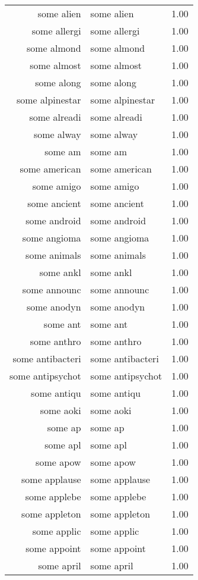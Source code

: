 \begin{table}[ht]
\begin{tabular}{rlr}
  some alien & some alien & 1.00 \\ 
  some allergi & some allergi & 1.00 \\ 
  some almond & some almond & 1.00 \\ 
  some almost & some almost & 1.00 \\ 
  some along & some along & 1.00 \\ 
  some alpinestar & some alpinestar & 1.00 \\ 
  some alreadi & some alreadi & 1.00 \\ 
  some alway & some alway & 1.00 \\ 
  some am & some am & 1.00 \\ 
  some american & some american & 1.00 \\ 
  some amigo & some amigo & 1.00 \\ 
  some ancient & some ancient & 1.00 \\ 
  some android & some android & 1.00 \\ 
  some angioma & some angioma & 1.00 \\ 
  some animals & some animals & 1.00 \\ 
  some ankl & some ankl & 1.00 \\ 
  some announc & some announc & 1.00 \\ 
  some anodyn & some anodyn & 1.00 \\ 
  some ant & some ant & 1.00 \\ 
  some anthro & some anthro & 1.00 \\ 
  some antibacteri & some antibacteri & 1.00 \\ 
  some antipsychot & some antipsychot & 1.00 \\ 
  some antiqu & some antiqu & 1.00 \\ 
  some aoki & some aoki & 1.00 \\ 
  some ap & some ap & 1.00 \\ 
  some apl & some apl & 1.00 \\ 
  some apow & some apow & 1.00 \\ 
  some applause & some applause & 1.00 \\ 
  some applebe & some applebe & 1.00 \\ 
  some appleton & some appleton & 1.00 \\ 
  some applic & some applic & 1.00 \\ 
  some appoint & some appoint & 1.00 \\ 
  some april & some april & 1.00 \\ 

\end{tabular}
\end{table}
